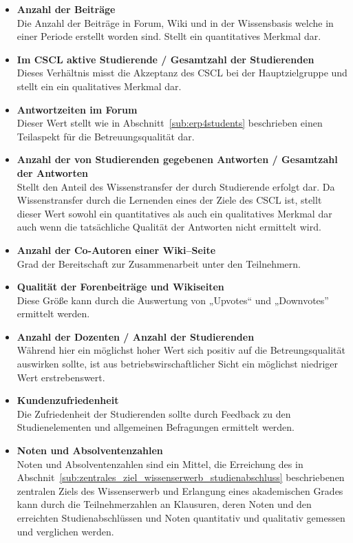 \begin{itemize}
	\item \textbf{Anzahl der Beiträge}\\ Die Anzahl der Beiträge in Forum, Wiki und in der Wissensbasis welche in einer Periode erstellt worden sind. Stellt ein quantitatives Merkmal dar. 
	\item \textbf{Im CSCL aktive Studierende / Gesamtzahl der Studierenden}\\ Dieses Verhältnis misst die Akzeptanz des \ac{CSCL} bei der Hauptzielgruppe und stellt ein ein qualitatives Merkmal dar.
	\item \textbf{Antwortzeiten im Forum}\\ Dieser Wert stellt wie in Abschnitt~\ref{sub:erp4students} beschrieben einen Teilaspekt für die Betreuungsqualität dar.
	\item \textbf{Anzahl der von Studierenden gegebenen Antworten / Gesamtzahl der Antworten}\\ Stellt den Anteil des Wissenstransfer der durch Studierende erfolgt dar. Da Wissenstransfer durch die Lernenden eines der Ziele des \ac{CSCL} ist, stellt dieser Wert sowohl ein quantitatives als auch ein qualitatives Merkmal dar auch wenn die tatsächliche Qualität der Antworten nicht ermittelt wird.
	\item \textbf{Anzahl der Co-Autoren einer Wiki–Seite}\\ Grad der Bereitschaft zur Zusammenarbeit unter den Teilnehmern.
	\item \textbf{Qualität der Forenbeiträge und Wikiseiten}\\ Diese Größe kann durch die Auswertung von „Upvotes“ und „Downvotes” ermittelt werden.
	\item \textbf{Anzahl der Dozenten / Anzahl der Studierenden}\\ Während hier ein möglichst hoher Wert sich positiv auf die Betreungsqualität auswirken sollte, ist aus betriebswirschaftlicher Sicht ein möglichst niedriger Wert erstrebenswert.
	\item \textbf{Kundenzufriedenheit}\\ Die Zufriedenheit der Studierenden sollte durch Feedback zu den Studienelementen und allgemeinen Befragungen ermittelt werden.
	\item \textbf{Noten und Absolventenzahlen}\\ Noten und Absolventenzahlen sind ein Mittel, die Erreichung des in Abschnit~\ref{sub:zentrales_ziel_wissenserwerb_studienabschluss} beschriebenen zentralen Ziels des Wissenserwerb und Erlangung eines akademischen Grades kann durch die Teilnehmerzahlen an Klausuren, deren Noten und den erreichten Studienabschlüssen und Noten quantitativ und qualitativ gemessen und verglichen werden.
\end{itemize}



